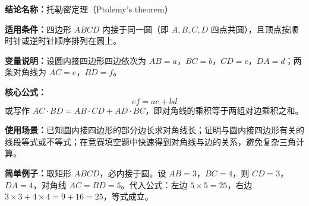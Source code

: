 \textbf{结论名称：}托勒密定理（Ptolemy's theorem）

\textbf{适用条件：}四边形 $ABCD$ 内接于同一圆（即 $A,B,C,D$ 四点共圆），且顶点按顺时针或逆时针顺序排列在圆上。

\textbf{变量说明：}设圆内接四边形四边依次为 $AB=a$，$BC=b$，$CD=c$，$DA=d$；两条对角线为 $AC=e$，$BD=f$。

\textbf{核心公式：}
\[
\boxed{ef = ac + bd}
\]
或写作 $AC \cdot BD = AB \cdot CD + AD \cdot BC$，即对角线的乘积等于两组对边乘积之和。

\textbf{使用场景：}已知圆内接四边形的部分边长求对角线长；证明与圆内接四边形有关的线段等式或不等式；在竞赛填空题中快速得到对角线与边的关系，避免复杂三角计算。

\textbf{简单例子：}取矩形 $ABCD$，必内接于圆。设 $AB=3$，$BC=4$，则 $CD=3$，$DA=4$，对角线 $AC=BD=5$。代入公式：左边 $5\times 5=25$，右边 $3\times3 + 4\times4 = 9+16=25$，等式成立。